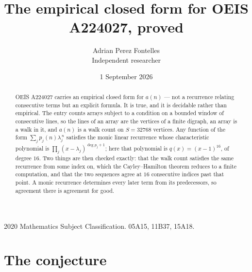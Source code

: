 \documentclass[11pt,a4paper]{article}
\title{The empirical closed form for OEIS A224027, proved}
\author{Adrian Perez Fontelles\\ \small Independent researcher}
\date{1 September 2026}
\theoremstyle{plain}
\theoremstyle{definition}
\begin{document}
\maketitle

\begin{abstract}
OEIS A224027 carries an empirical closed form for $a(n)$ --- not a recurrence relating
consecutive terms but an explicit formula. It is true, and it is decidable rather than
empirical. The entry counts arrays subject to a condition on a bounded window of consecutive lines, so the lines of an array are the
vertices of a finite digraph, an array is a walk in it, and $a(n)$ is a walk count on
$S=32768$ vertices. Any function of the form $\sum_j p_j(n)\lambda_j^{\,n}$ satisfies the
monic linear recurrence whose characteristic polynomial is
$\prod_j(x-\lambda_j)^{\deg p_j+1}$; here that polynomial is $q(x)=(x-1)^{16}$, of degree
$16$. Two things are then checked exactly: that the walk count satisfies the same
recurrence from some index on, which the Cayley--Hamilton theorem reduces to a finite
computation, and that the two sequences agree at $16$ consecutive indices past that
point. A monic recurrence determines every later term from its predecessors, so agreement
there is agreement for good.
\end{abstract}

\noindent\small 2020 Mathematics Subject Classification. 05A15, 11B37, 15A18.\normalsize

\section{The conjecture}
\end{document}
